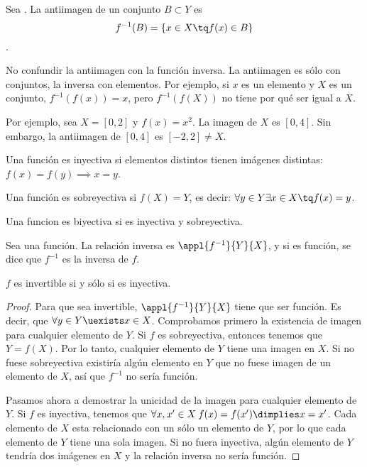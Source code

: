 \documentclass[nochap]{apuntes}
\begin{document}
\begin{defn}[Antiimagen]
Sea \stdf. La antiimagen de un conjunto $B\subset Y$ es
\[ f^{-1}(B)=\{ x\in X \tq f(x) \in B\}\].
\end{defn}

\begin{remark}No confundir la antiimagen con la función inversa. La antiimagen es sólo con conjuntos, la inversa con elementos. Por ejemplo, si $x$ es un elemento y $X$ es un conjunto, $f^{-1}(f(x))=x$, pero $f^{-1}(f(X))$ no tiene por qué ser igual a $X$.

Por ejemplo, sea $X=[0,2]$ y $f(x)=x^2$. La imagen de $X$ es $[0,4]$. Sin embargo, la antiimagen de $[0,4]$ es $[-2,2]\neq X$.
\end{remark}

\begin{defn} Una función \stdf es inyectiva si elementos distintos tienen imágenes distintas: $f(x)=f(y) \implies x=y$.
\end{defn}

\begin{defn}
Una función \stdf es sobreyectiva si $f(X)=Y$, es decir: $\forall y \in Y \exists x \in X \tq f(x)=y$.
\end{defn}

\begin{defn}
Una funcion es biyectiva si es inyectiva y sobreyectiva.
\end{defn}

\begin{defn} Sea \stdf una función. La relación inversa es $\appl{f^{-1}}{Y}{X}$, y si es función, se dice que $f^{-1}$ es la inversa de $f$.
\end{defn}

\begin{prop} $f$ es invertible si y sólo si es inyectiva.

\begin{proof}
Para que \stdf sea invertible, $\appl{f^{-1}}{Y}{X}$ tiene que ser función. Es decir, que $\forall y\in Y \uexists x \in X$. Comprobamos primero la existencia de imagen para cualquier elemento de $Y$. Si $f$ es sobreyectiva, entonces tenemos que $Y=f(X)$. Por lo tanto, cualquier elemento de $Y$ tiene una imagen en $X$. Si no fuese sobreyectiva existiría algún elemento en $Y$ que no fuese imagen de un elemento de $X$, así que $f^{-1}$ no sería función.

Pasamos ahora a demostrar la unicidad de la imagen para cualquier elemento de $Y$. Si $f$ es inyectiva, tenemos que $\forall x,x' \in X \: f(x)=f(x') \dimplies x=x'$. Cada elemento de $X$ esta relacionado con un sólo un elemento de $Y$, por lo que cada elemento de $Y$ tiene una sola imagen. Si no fuera inyectiva, algún elemento de $Y$ tendría dos imágenes en $X$ y la relación inversa no sería función.
\end{proof}
\end{prop}
\end{document}
